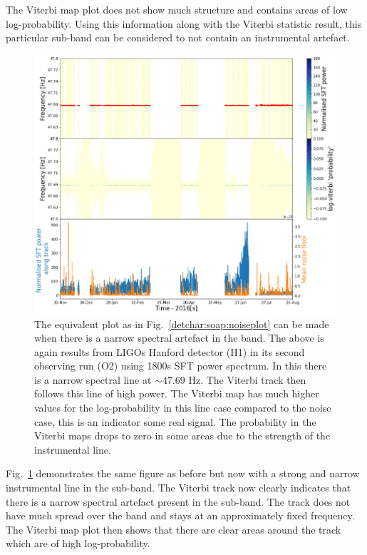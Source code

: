 The Viterbi map plot does not show much structure and contains areas of low log-probability.
Using this information along with the Viterbi statistic result, this particular sub-band can be considered to not contain an instrumental artefact. 
%
\begin{figure}
	\centering
	\includegraphics[width=\textwidth]{C5_detchar/track_F47_6_47_8_linenarrow.png}
	\caption{The equivalent plot as in Fig.~\ref{detchar:soap:noiseplot} can be made when there is a narrow spectral artefact in the band. The above is again results from \acp{LIGO} Hanford detector (H1) in its second observing run (O2) using 1800s \ac{SFT} power spectrum. In this there is a narrow spectral line at $\sim 47.69$ Hz. The Viterbi track then follows this line of high power. The Viterbi map has much higher values for the log-probability in this line case compared to the noise case, this is an indicator some real signal. The probability in the Viterbi maps drops to zero in some areas due to the strength of the instrumental line. }
	\label{detchar:soap:lineplot}
\end{figure}
%
Fig.~\ref{detchar:soap:lineplot} demonstrates the same figure as before but now with a strong and narrow instrumental line in the sub-band. 
The Viterbi track now clearly indicates that there is a narrow spectral artefact present in the sub-band. The track does not have much spread over the band and stays at an approximately fixed frequency. 
The Viterbi map plot then shows that there are clear areas around the track which are of high log-probability. 

